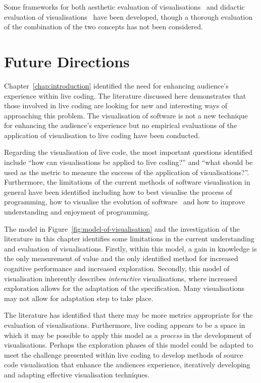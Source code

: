 Some frameworks for both aesthetic evaluation of visualisations~\cite{Cawthon2007,Purchase1996} and didactic evaluation of visualisations~\cite{VanWijk2005} have been developed, though a thorough evaluation of the combination of the two concepts has not been considered.

\section{Future Directions}

Chapter~\ref{chap:introduction} identified the need for enhancing audience's experience within live coding. The literature discussed here demonstrates that those involved in live coding are looking for new and interesting ways of approaching this problem. The visualisation of software is not a new technique for enhancing the audience's experience but no empirical evaluations of the application of visualisation to live coding have been conducted.

Regarding the visualisation of live code, the most important questions identified include ``how can visualisations be applied to live coding?'' and ``what should be used as the metric to measure the success of the application of visualisations?''. Furthermore, the limitations of the current methods of software visualisation in general have been identified including how to best visualise the process of programming, how to visualise the evolution of software~\cite{Gall1999} and how to improve understanding and enjoyment of programming.

The model in Figure~\ref{fig:model-of-visualisation} and the investigation of the literature in this chapter identifies some limitations in the current understanding and evaluation of visualisations. Firstly, within this model, a gain in knowledge is the only measurement of value and the only identified method for increased cognitive performance and increased exploration. Secondly, this model of visualisation inherently describes \textit{interactive} visualisations, where increased exploration allows for the adaptation of the specification. Many visualisations may not allow for adaptation step to take place. 

The literature has identified that there may be more metrics appropriate for the evaluation of visualisations. Furthermore, live coding appears to be a space in which it may be possible to apply this model as a \textit{process} in the development of visualisations. Perhaps the exploration phases of this model could be adapted to meet the challenge presented within live coding to develop methods of source code visualisation that enhance the audiences experience, iteratively developing and adapting effective visualisation techniques.

